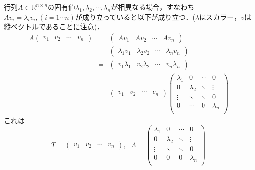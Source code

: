 \noindent
行列$A \in {\mathbb R}^{n \times n}$の固有値$\lambda_1, \lambda_2,
\cdots, \lambda_n$が相異なる場合，すなわち$A v_i = \lambda_i v_i, (i =
1 \cdots n)$が成り立っていると以下が成り立つ．($\lambda$はスカラー，$v$は縦ベクトルであることに注意)．
\begin{eqnarray}
 A
 \left(
 \begin{array}{cccc}
  v_1 & v_2 & \cdots & v_n 
 \end{array}
 \right)
 &=&
 \left(
 \begin{array}{cccc}
  Av_1 & Av_2 & \cdots & Av_n 
 \end{array}
 \right) \\
 &=&
 \left(
 \begin{array}{cccc}
  \lambda_1 v_1 & \lambda_2 v_2 & \cdots & \lambda_n v_n 
 \end{array}
 \right) \nonumber \\
 &=&
 \left(
 \begin{array}{cccc}
  v_1 \lambda_1 & v_2 \lambda_2 & \cdots & v_n \lambda_n 
 \end{array}
 \right) \nonumber \\
 &=&
 \left(
 \begin{array}{cccc}
  v_1 & v_2 & \cdots & v_n 
 \end{array}
 \right)
 \left(
 \begin{array}{cccc}
  \lambda_1 & 0         & \cdots & 0 \\
   0        & \lambda_2 & \ddots & \vdots \\
   \vdots   & \ddots    & \ddots & 0 \\
   0        & \cdots    & 0      & \lambda_n \\
 \end{array}
 \right)
\end{eqnarray}
これは
\begin{equation}
	T =
	\left( 
	\begin{array}{cccc}
		v_1 & v_2 & \cdots & v_n 
	\end{array}
	\right)
	, \ \ \ 
	\Lambda = 
	\left(
	\begin{array}{cccc}
		\lambda_1 & 0        & \cdots & 0 \\
		0        & \lambda_2 & \ddots & \vdots \\
		\vdots   & \ddots    & \ddots & 0\\
		0        & 0         & 0       & \lambda_n \\
	\end{array}
	\right)
\end{equation}
